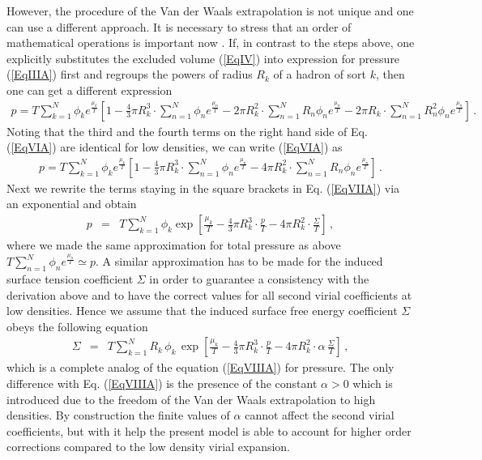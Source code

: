 \documentclass[12pt]{article}
\begin{document}
However, the procedure of  the Van der Waals extrapolation is not unique and one can use a different approach. 
It is necessary to stress  that an order of  mathematical operations is important now \cite{Bugaev:13NPA}.  If, in contrast to 
the steps above,  one  explicitly substitutes the excluded volume  (\ref{EqIV}) into  expression for pressure  (\ref{EqIIIA})  first  and   regroups the powers of  radius $R_k$ of  a  
hadron of sort $k$, then one can  get a different expression
%
\begin{eqnarray}
\label{EqVIA}
%
p=T\sum_{k=1}^{N} \phi_{k}e^{\frac{{\mu}_{k}}{T}}\left[1-
\frac{4}{3}\pi R_{k}^{3}\cdot\sum_{n=1}^{N}\phi_{n}e^{\frac{{\mu}_{n}}{T}}-
2\pi R_{k}^{2}\cdot \sum_{n=1}^{N}R_{n} \phi_{n}e^{\frac{{\mu}_{n}}{T}}-
2\pi R_{k}\cdot\sum_{n=1}^{N}R_{n}^{2} \phi_{n}e^{\frac{{\mu}_{n}}{T}}\right] \,. 
%
\end{eqnarray}
%
Noting that the third and the fourth  terms on the right hand side  of  Eq.  (\ref{EqVIA}) are identical for low densities,
we can write  (\ref{EqVIA}) as
%
\begin{eqnarray}
\label{EqVIIA}
%
p=T\sum_{k=1}^{N} \phi_{k}e^{\frac{{\mu}_{k}}{T}}\left[1-
\frac{4}{3}\pi R_{k}^{3}\cdot\sum_{n=1}^{N}\phi_{n}e^{\frac{{\mu}_{n}}{T}}-
4\pi R_{k}^{2}\cdot \sum_{n=1}^{N}R_{n} \phi_{n}e^{\frac{{\mu}_{n}}{T}} \right] \,. 
%
\end{eqnarray}
%
Next we rewrite  the terms staying in the square brackets  in Eq. (\ref{EqVIIA}) via an exponential   
and  obtain 
%
\begin{eqnarray}\label{EqVIIIA}
%
p&=& T\sum_{k=1}^{N} \phi_{k}
\exp\left[ \frac{{\mu}_{k}}{T} -\frac{4}{3}\pi R_{k}^{3}\cdot\frac{p}{T}-4\pi R_{k}^{2}\cdot \frac{\Sigma}{T} \right] \,, 
%
\end{eqnarray}
%
where we made the same approximation for total pressure as above $T \sum_{n=1}^{N}\phi_{n}e^{\frac{{\mu}_{n}}{T}} \simeq p$. A similar approximation has to be made for the induced surface tension  coefficient $\Sigma$
in order to guarantee a consistency   with the  derivation above  and to have the   correct   values for  all second virial coefficients at low densities.  Hence  we assume that   the induced  surface free energy  coefficient  $\Sigma$ obeys  the following equation
%
\begin{eqnarray}
\label{EqIXA}
%
\Sigma & =  & T  \sum_{k=1}^N  R_k \, \phi_{k} \, \exp\left[ \frac{{\mu}_{k}}{T} -\frac{4}{3}\pi R_{k}^{3}\cdot\frac{p}{T}-4\pi R_{k}^{2}\cdot \alpha\, \frac{\Sigma}{T} \right] \,,
%
\end{eqnarray}
%
which is a complete analog of the equation (\ref{EqVIIIA}) for pressure. The only difference with  Eq. (\ref{EqVIIIA}) is the presence of   the constant $\alpha > 0$  which  is introduced due to the freedom of the Van der Waals extrapolation to high densities.  By construction the finite values of  $\alpha$ cannot affect the second virial coefficients, but
with it help  the present model is able to  account for higher order corrections compared  to the low density virial expansion. 
 
\end{document}
